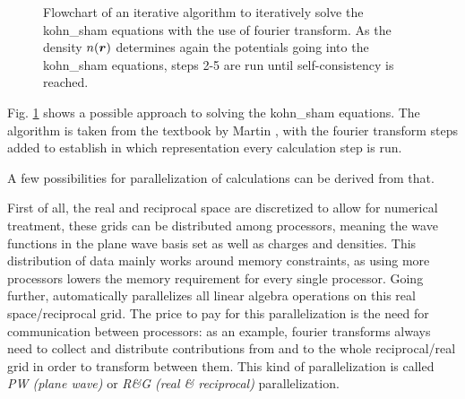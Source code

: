 \documentclass[main.tex]{subfiles}
\begin{document}
\begin{figure}[htb!]
{}
\caption{Flowchart of an iterative algorithm to iteratively solve the \acrshort{kohn_sham} equations with the use of fourier transform. As the density \(n(\vb*{r})\) determines again the potentials going into the \acrshort{kohn_sham} equations, steps 2-5 are run until self-consistency is reached.}
\label{fig:diagram-scf-calculations}
\end{figure}
Fig. \ref{fig:diagram-scf-calculations} shows a possible approach to solving the \acrshort{kohn_sham} equations.
The algorithm is taken from the textbook by Martin \cite{martin_electronic_2004}, with the fourier transform steps added to establish in which representation every calculation step is run.



A few possibilities for parallelization of calculations can be derived from that.

First of all, the real and reciprocal space are discretized to allow for numerical treatment, these grids can be distributed among processors, meaning the wave functions in the plane wave basis set as well as charges and densities.
This distribution of data mainly works around memory constraints, as using more processors lowers the memory requirement for every single processor.
Going further, \QE automatically parallelizes all linear algebra operations on this real space/reciprocal grid.
The price to pay for this parallelization is the need for communication between processors: as an example, fourier transforms always need to collect and distribute contributions from and to the whole reciprocal/real grid in order to transform between them.
This kind of parallelization is called \emph{PW (plane wave)} or \emph{R\&G (real \& reciprocal)} parallelization. 
\end{document}
